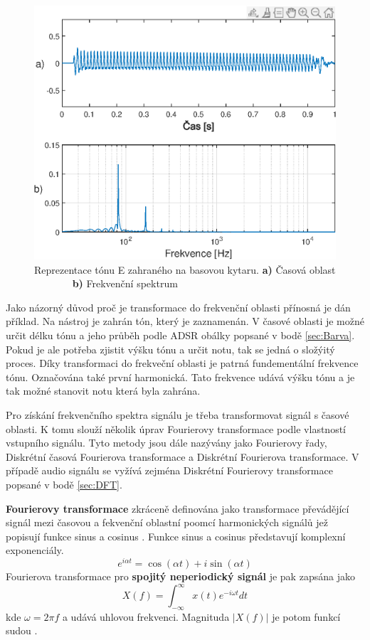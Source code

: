   \begin{figure}[H]
    \centering
        \includegraphics[width = 0.8\linewidth]{obrazky/Bass_tone_spectrum.eps}
    \caption{Reprezentace tónu E zahraného na basovou kytaru. \textbf{a)} Časová oblast ~ ~ ~ ~ ~\textbf{b)} Frekvenční spektrum}
    \label{fig:Bass_tone}
\end{figure}
  
  Jako názorný důvod proč je transformace do frekvenční oblasti přínosná je dán příklad. Na nástroj je zahrán tón, který je zaznamenán. 
  V časové oblasti je možné určit délku tónu a jeho průběh podle ADSR obálky popsané v bodě \ref{sec:Barva}.
  Pokud je ale potřeba zjistit výšku tónu a určit notu, tak se jedná o složýitý proces.
  Díky transformaci do frekveční oblasti je patrná fundementální frekvence tónu.
  Označována také první harmonická.
  Tato frekvence udává výšku tónu a je tak možné stanovit notu která byla zahrána.

  Pro získání frekvenčního spektra signálu je třeba transformovat signál s časové oblasti. K tomu slouží několik úprav Fourierovy transformace podle vlastností vstupního signálu. Tyto metody jsou dále nazývány jako Fourierovy řady, Diskrétní časová Fourierova transformace a Diskrétní Fourierova transformace. V případě audio signálu se vyžívá zejména Diskrétní Fourierovy transformace popsané v bodě \ref{sec:DFT}.

  \textbf{Fourierovy transformace} zkráceně definována jako transformace převádějící signál mezi časovou a fekvenční oblastní poomcí harmonických signálů jež popisují funkce sinus a cosinus \cite{bracewell1978fourier}. Funkce sinus a cosinus představují komplexní exponenciály.
  \begin{equation}
    e^{i\alpha t} = \cos(\alpha t) + i \sin(\alpha t)
  \end{equation}
  Fourierova transformace pro \textbf{ spojitý neperiodický signál} je pak zapsána jako
  \begin{equation}
    X(f) = \int_{-\infty}^{\infty} x(t) e^{-i\omega t} dt
  \end{equation}
  kde $\omega = 2\pi f$ a udává uhlovou frekvenci. Magnituda $|X(f)|$ je potom funkcí sudou \cite{sneddon1995fourier}.


